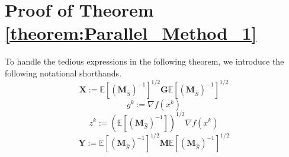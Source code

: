 \documentclass[11pt]{article}
\newcommand{\bX}{\mathbf{X}}
\newcommand{\bY}{\mathbf{Y}}
\begin{document}

\newpage	
\appendix
\section{Proof of Theorem \ref{theorem:Parallel_Method_1}}
	To handle the tedious expressions in the following theorem, we introduce the following notational shorthands.
	\begin{equation}\label{eq:x}
	\bX:=\mathbb{E}[(\mathbf{M}_{\hat{S}})^{-1}]^{1/2}\mathbf{G}\mathbb{E}[(\mathbf{M}_{\hat{S}})^{-1}]^{1/2}
	\end{equation}
	\begin{equation} \label{eq:defk}
	g^k:= \nabla f(x^k)
	\end{equation}
	\begin{equation} \label{eq:defz}
	z^k:= (\mathbb{E}[(\mathbf{M}_{\hat{S}})^{-1}])^{1/2}\nabla f(x^k)
	\end{equation}
	\begin{equation} \label{eq:y}
	\bY:=\mathbb{E}[(\mathbf{M}_{\hat{S}})^{-1}]^{1/2} \mathbf{M}  \mathbb{E}[(\mathbf{M}_{\hat{S}})^{-1}]^{1/2}
	\end{equation}
	
\end{document}
